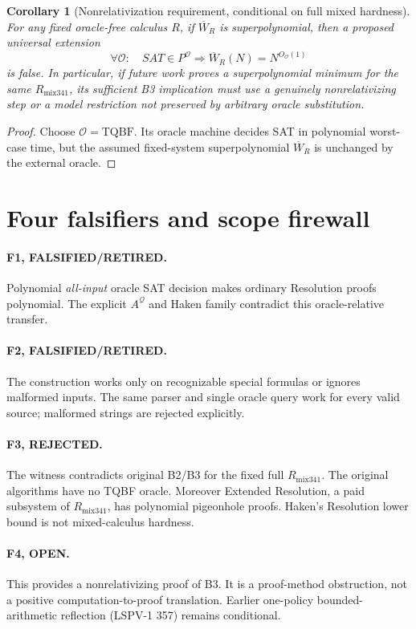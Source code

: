 \documentclass[11pt]{article}
\newtheorem{corollary}[theorem]{Corollary}
\begin{document}
\begin{corollary}[Nonrelativization requirement, conditional on full mixed hardness]
For any fixed oracle-free calculus $R$, if $\overline W_R$ is superpolynomial, then a proposed universal extension
\[
\forall\mathcal O:\quad SAT\in P^{\mathcal O}\Longrightarrow
\overline W_R(N)=N^{O_{\mathcal O}(1)}
\]
is false. In particular, if future work proves a superpolynomial minimum for the \emph{same} $R_{\mathrm{mix341}}$, its sufficient B3 implication must use a genuinely nonrelativizing step or a model restriction not preserved by arbitrary oracle substitution.
\end{corollary}
\begin{proof}
Choose $\mathcal O=\mathrm{TQBF}$. Its oracle machine decides SAT in polynomial worst-case time, but the assumed fixed-system superpolynomial $\overline W_R$ is unchanged by the external oracle.
\end{proof}

\section*{Four falsifiers and scope firewall}
\paragraph{F1, FALSIFIED/RETIRED.} Polynomial \emph{all-input} oracle SAT decision makes ordinary Resolution proofs polynomial. The explicit $A^{\mathcal Q}$ and Haken family contradict this oracle-relative transfer.
\paragraph{F2, FALSIFIED/RETIRED.} The construction works only on recognizable special formulas or ignores malformed inputs. The same parser and single oracle query work for every valid source; malformed strings are rejected explicitly.
\paragraph{F3, REJECTED.} The witness contradicts original B2/B3 for the fixed full $R_{\mathrm{mix341}}$. The original algorithms have no TQBF oracle. Moreover Extended Resolution, a paid subsystem of $R_{\mathrm{mix341}}$, has polynomial pigeonhole proofs. Haken's Resolution lower bound is not mixed-calculus hardness.
\paragraph{F4, OPEN.} This provides a nonrelativizing proof of B3. It is a proof-method obstruction, not a positive computation-to-proof translation. Earlier one-policy bounded-arithmetic reflection (LSPV-1 357) remains conditional.
\end{document}
